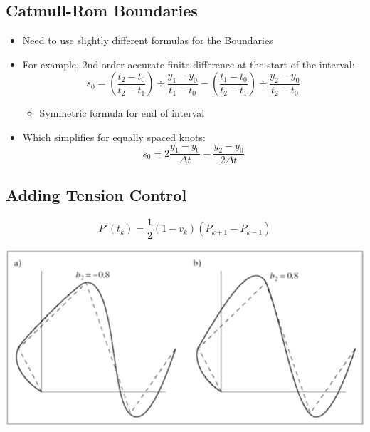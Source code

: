 \documentclass{article}
\begin{document}
\subsection*{Catmull-Rom Boundaries}
\begin{itemize}
    \item Need to use slightly different formulas for the Boundaries
    \item For example, 2nd order accurate finite difference at the start of the interval:
    \[s_0 = \left(\frac{t_2 - t_0}{t_2 - t_1}\right)\div \frac{y_1 - y_0}{t_1 - t_0} - \left(\frac{t_1 - t_0}{t_2 - t_1}\right) \div \frac{y_2 - y_0}{t_2 - t_0}\]
    \begin{itemize}
        \item Symmetric formula for end of interval
    \end{itemize}
    \item Which simplifies for equally spaced knots:
    \[s_0 = 2\frac{y_1 - y_0}{\Delta t} - \frac{y_2 - y_0}{2\Delta t}\]
\end{itemize}

\subsection*{Adding Tension Control}
\[P'(t_k) = \frac{1}{2}(1 - v_k)(P_{k + 1} - P_{k - 1})\]
\begin{center}
    \includegraphics*[scale=0.7]{W3_12.png}
\end{center}
\end{document}
